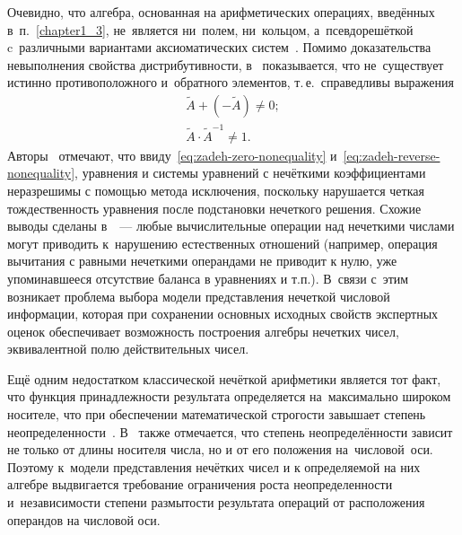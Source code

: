 Очевидно, что алгебра, основанная на арифметических операциях, введённых в~п.~\ref{chapter1_3}, не~является ни~полем, ни~кольцом, а~псевдорешёткой~\cite{Kaufmann} c~различными вариантами аксиоматических систем~\cite{Axioms_Fuzzy_Algebra}. Помимо доказательства невыполнения свойства дистрибутивности, в~\cite{Pospelov, Borisov_Alexeev_Msk, Yakhyaeva, Yager_Arithmetics} показывается, что не~существует истинно противоположного и~обратного элементов, т.\,е.~справедливы выражения
\begin{gather}
	\label{eq:zadeh-zero-nonequality}
	\tilde{A}+\left( -\tilde{A} \right)\ne 0; \\
	\label{eq:zadeh-reverse-nonequality}
	\tilde{A}\cdot {{\tilde{A}}^{-1}}\ne 1.
\end{gather}
Авторы~\cite{Rutkovskaya} отмечают, что ввиду~\eqref{eq:zadeh-zero-nonequality} и~\eqref{eq:zadeh-reverse-nonequality}, уравнения и системы уравнений с нечёткими коэффициентами неразрешимы с помощью метода исключения, поскольку нарушается четкая тождественность уравнения после подстановки нечеткого решения. Схожие выводы сделаны в~\cite{Sokolov}~--- любые вычислительные операции над нечеткими числами могут приводить к~нарушению естественных отношений (например, операция вычитания с равными нечеткими операндами не приводит к нулю, уже упоминавшееся отсутствие баланса в уравнениях и т.п.). В~связи с~этим возникает проблема выбора модели представления нечеткой числовой информации, которая при сохранении основных исходных свойств экспертных оценок обеспечивает возможность построения алгебры нечетких чисел, эквивалентной полю действительных чисел. 

Ещё одним недостатком классической нечёткой арифметики является тот факт, что функция принадлежности результата определяется на~максимально широком носителе, что при обеспечении математической строгости завышает степень неопределенности~\cite{Evdokimov}. В~\cite{Yakhyaeva} также отмечается, что степень неопределённости зависит не только от длины носителя числа, но и от его положения на~числовой~оси. Поэтому к~модели представления нечётких чисел и к определяемой на них алгебре выдвигается требование ограничения роста неопределенности и~независимости степени размытости результата операций от расположения операндов на числовой оси.

